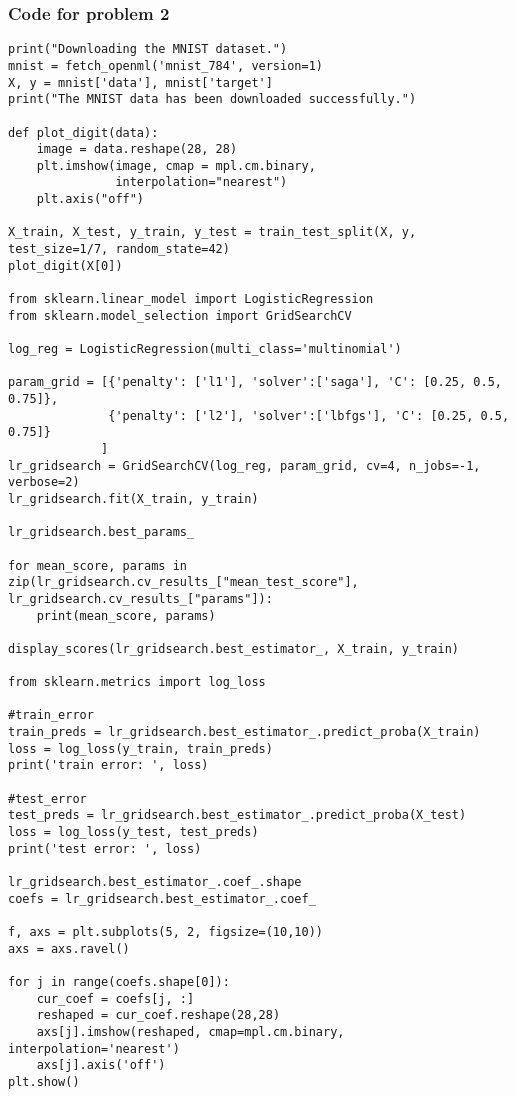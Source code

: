 \documentclass[12pt]{article}%
\begin{document}
\subsubsection*{Code for problem 2}
\begin{lstlisting}
print("Downloading the MNIST dataset.")
mnist = fetch_openml('mnist_784', version=1)
X, y = mnist['data'], mnist['target']
print("The MNIST data has been downloaded successfully.")

def plot_digit(data):
    image = data.reshape(28, 28)
    plt.imshow(image, cmap = mpl.cm.binary,
               interpolation="nearest")
    plt.axis("off")
    
X_train, X_test, y_train, y_test = train_test_split(X, y, test_size=1/7, random_state=42)
plot_digit(X[0])

from sklearn.linear_model import LogisticRegression
from sklearn.model_selection import GridSearchCV

log_reg = LogisticRegression(multi_class='multinomial')

param_grid = [{'penalty': ['l1'], 'solver':['saga'], 'C': [0.25, 0.5, 0.75]},
              {'penalty': ['l2'], 'solver':['lbfgs'], 'C': [0.25, 0.5, 0.75]}
             ]
lr_gridsearch = GridSearchCV(log_reg, param_grid, cv=4, n_jobs=-1, verbose=2)
lr_gridsearch.fit(X_train, y_train)

lr_gridsearch.best_params_

for mean_score, params in zip(lr_gridsearch.cv_results_["mean_test_score"], lr_gridsearch.cv_results_["params"]):
    print(mean_score, params)
    
display_scores(lr_gridsearch.best_estimator_, X_train, y_train)

from sklearn.metrics import log_loss

#train_error
train_preds = lr_gridsearch.best_estimator_.predict_proba(X_train)
loss = log_loss(y_train, train_preds)
print('train error: ', loss)

#test_error
test_preds = lr_gridsearch.best_estimator_.predict_proba(X_test)
loss = log_loss(y_test, test_preds)
print('test error: ', loss)

lr_gridsearch.best_estimator_.coef_.shape
coefs = lr_gridsearch.best_estimator_.coef_

f, axs = plt.subplots(5, 2, figsize=(10,10))
axs = axs.ravel()

for j in range(coefs.shape[0]):
    cur_coef = coefs[j, :]
    reshaped = cur_coef.reshape(28,28)
    axs[j].imshow(reshaped, cmap=mpl.cm.binary, interpolation='nearest')
    axs[j].axis('off')
plt.show()
\end{lstlisting}
\end{document}
